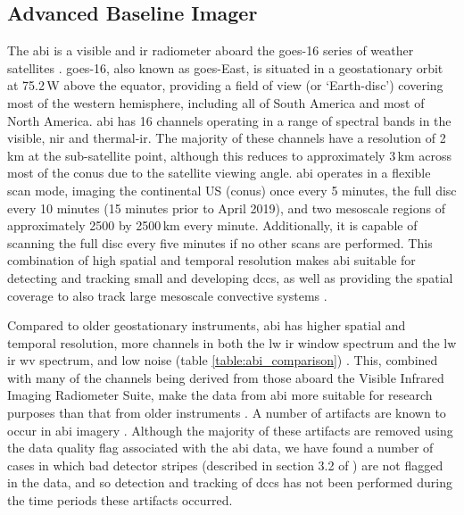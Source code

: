 \subsection{Advanced Baseline Imager}


The \acrshort{abi} is a visible and \acrshort{ir} radiometer aboard the \acrshort{goes}-16 series of weather satellites \citep{schmit_closer_2016}.
\acrshort{goes}-16, also known as \acrshort{goes}-East, is situated in a geostationary orbit at 75.2\,\textdegree W above the equator, providing a field of view (or `Earth-disc') covering most of the western hemisphere, including all of South America and most of North America.
\acrshort{abi} has 16 channels operating in a range of spectral bands in the visible, \acrshort{nir} and thermal-\acrshort{ir}.
The majority of these channels have a resolution of 2\,\unit{km} at the sub-satellite point, although this reduces to approximately 3\,\unit{km} across most of the \acrshort{conus} due to the satellite viewing angle.
\acrshort{abi} operates in a flexible scan mode, imaging the continental US (\acrshort{conus}) once every 5 minutes, the full disc every 10 minutes (15 minutes prior to April 2019), and two mesoscale regions of approximately 2500 by 2500\,\unit{km} every minute.
Additionally, it is capable of scanning the full disc every five minutes if no other scans are performed.
This combination of high spatial and temporal resolution makes \acrshort{abi} suitable for detecting and tracking small and developing \acrshort{dcc}s, as well as providing the spatial coverage to also track large mesoscale convective systems \citep{heikenfeld_tobac_2019}.

Compared to older geostationary instruments, \acrshort{abi} has higher spatial and temporal resolution, more channels in both the \acrshort{lw} \acrshort{ir} window spectrum and the \acrshort{lw} \acrshort{ir} \acrshort{wv} spectrum, and low noise (table \ref{table:abi_comparison}) \citep{iacovazzi_goes-16_2020}.
This, combined with many of the channels being derived from those aboard the Visible Infrared Imaging Radiometer Suite, make the data from \acrshort{abi} more suitable for research purposes than that from older instruments \citep{heidinger_chapter_2020}.
A number of artifacts are known to occur in \acrshort{abi} imagery \citep{gunshor_goes-r_2020}.
Although the majority of these artifacts are removed using the data quality flag associated with the \acrshort{abi} data, we have found a number of cases in which bad detector stripes (described in section 3.2 of \citealp{gunshor_goes-r_2020}) are not flagged in the data, and so detection and tracking of \acrshort{dcc}s has not been performed during the time periods these artifacts occurred.

